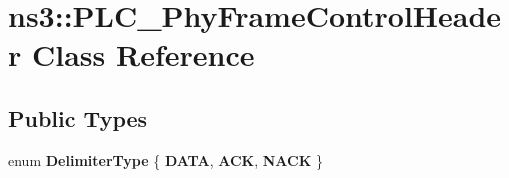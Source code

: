 \hypertarget{classns3_1_1PLC__PhyFrameControlHeader}{\section{ns3\-:\-:\-P\-L\-C\-\_\-\-Phy\-Frame\-Control\-Header \-Class \-Reference}
\label{classns3_1_1PLC__PhyFrameControlHeader}
}
\subsection*{\-Public \-Types}
\begin{DoxyCompactItemize}
\item 
enum {\bfseries \-Delimiter\-Type} \{ {\bfseries \-D\-A\-T\-A}, 
{\bfseries \-A\-C\-K}, 
{\bfseries \-N\-A\-C\-K}
 \}
\end{DoxyCompactItemize}

